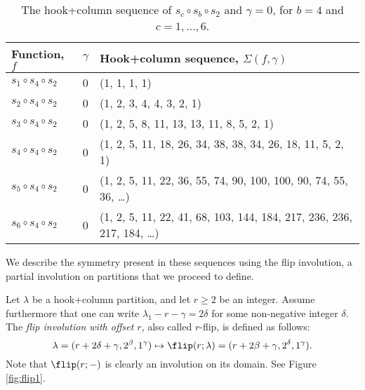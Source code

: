\documentclass[twoside]{article}
\begin{document}
 
\begin{table}[h]
    \centering
    {
    \footnotesize %
    \begin{tabular}{  l | l | l }
    \toprule
    Function, $f$ & $\gamma$  & Hook+column sequence, $\Sigma(f, \gamma)$  \\
    \midrule
    $s_1\circ s_4\circ s_2$ & 0 & (1, 1, 1, 1)\\
    $s_2\circ s_4\circ s_2$ & 0 & (1, 2, 3, 4, 4, 3, 2, 1)\\
    $s_3\circ s_4 \circ s_2$ & 0 & (1, 2, 5, 8, 11, 13, 13, 11, 8, 5, 2, 1)\\
    $s_4\circ s_4 \circ s_2$ & 0 & (1, 2, 5, 11, 18, 26, 34, 38, 38, 34, 26, 18, 11, 5, 2, 1)\\
    $s_5\circ s_4 \circ s_2$ & 0 & (1, 2, 5, 11, 22, 36, 55, 74, 90, 100, 100, 90, 74, 55, 36, 
    \ldots) %
    \\
    $s_6\circ s_4 \circ s_2$ & 0 & (1, 2, 5, 11, 22, 41, 68, 103, 144, 184, 217, 236, 236, 217, 184,
    \ldots) %
    \\
    \bottomrule
    \end{tabular}}
    \vspace{.5em } %
    \caption{The hook+column sequence of $s_c\circ s_b\circ s_2$ and $\gamma=0$, for $b= 4$ and $c=1, \ldots, 6$.}
    \label{tab:snos4os2}
\end{table}



We describe the symmetry  present in these sequences using the flip involution, a partial involution on partitions that we proceed to define.

\begin{de} 
Let $\lambda$ be a hook+column partition, and let $r\ge2$ be an integer.
Assume furthermore that one can write $\lambda_1 - r - \gamma = 2\delta$ for some non-negative integer $\delta$.
The \emph{flip involution with offset $r$}, also called $r$-flip, is defined as follows:
\[
\lambda = (r + 2\delta + \gamma, 2^\beta, 1^\gamma) 
\mapsto
\flip(r; \lambda) = (r + 2\beta + \gamma, 2^\delta, 1^\gamma).
\]
Note that $\flip(r; -)$ is clearly an involution on its domain. See Figure \ref{fig:flip1}.
\end{de}
\end{document}
